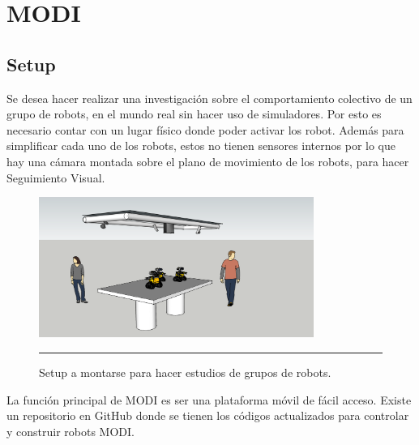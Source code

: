 
\chapter{MODI} %

\label{Chapter3} %



\section{Setup}

Se desea hacer realizar una investigación sobre el comportamiento colectivo de un grupo de robots, en el mundo real sin hacer uso de simuladores. Por esto  es necesario contar con un lugar físico donde poder activar los robot. Además para simplificar cada uno de los robots, estos no tienen sensores internos por lo que hay una cámara montada sobre el plano de movimiento de los robots, para hacer Seguimiento Visual.
\begin{figure}[htbp]
	\centering
		\includegraphics[width=0.8\textwidth]{./Figures/setup.png}
		\rule{35em}{0.5pt}
	\caption[Setup]{Setup a montarse para hacer estudios de grupos de robots.}
	\label{fig:setup}
\end{figure}

La función principal de MODI es ser una plataforma móvil de fácil acceso. Existe un repositorio en GitHub donde se tienen los códigos actualizados para controlar y construir robots MODI.  

